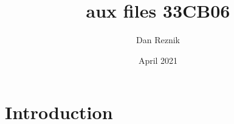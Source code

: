 \documentclass{article}
\title{aux files 33CB06}
\author{Dan Reznik}
\date{April 2021}
\begin{document}
\maketitle

\section{Introduction}
\end{document}
